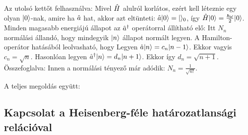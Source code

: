     Az utolsó kettőt felhasználva:
    Mivel $\hat{H}$ alulról korlátos, ezért kell léteznie egy olyan $\lvert0\rangle$-nak, amire ha $\hat{a}$ hat, akkor azt eltünteti: $\hat{a}\lvert0\rangle=\lvert\rangle_0$, így $\hat{H}\lvert0\rangle=\frac{\hbar\omega}{2}\lvert0\rangle$. Minden magasabb energiájú állapot az $\hat{a}^\dagger$ operátorral állítható elő:
    Itt $N_n$ normálási állandó, hogy mindegyik $\lvert n\rangle$ állapot normált legyen. A Hamilton-operátor hatásából leolvasható, hogy 
    Legyen $\hat{a}\lvert n\rangle=c_n\lvert n-1\rangle$. Ekkor
    vagyis $c_n=\sqrt{n}$. Hasonlóan legyen $\hat{a}^\dagger\lvert n\rangle=d_n\lvert n+1\rangle$. Ekkor
    így $d_n=\sqrt{n+1}$. Összefoglalva:
    Innen a normálási tényező már adódik: $N_n=\frac{1}{\sqrt{n!}}$. 
    
    A teljes megoldás együtt:
    \\[6pt]
    
  \subsection{Kapcsolat a Heisenberg-féle határozatlansági relációval}
   
